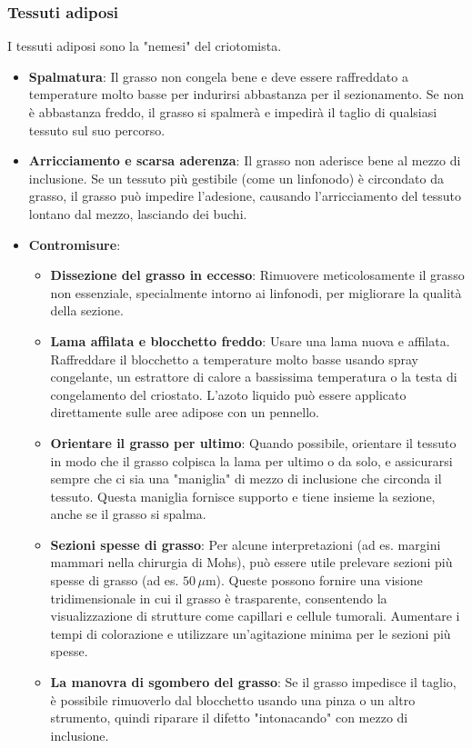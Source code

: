 \subsubsection{Tessuti adiposi}
I tessuti adiposi sono la "nemesi" del criotomista.
\begin{itemize}
    \item   \textbf{Spalmatura}: Il grasso non congela bene e deve essere raffreddato a temperature molto basse per indurirsi abbastanza per il sezionamento.  Se non è abbastanza freddo, il grasso si spalmerà e impedirà il taglio di qualsiasi tessuto sul suo percorso. 
    \item   \textbf{Arricciamento e scarsa aderenza}: Il grasso non aderisce bene al mezzo di inclusione.  Se un tessuto più gestibile (come un linfonodo) è circondato da grasso, il grasso può impedire l'adesione, causando l'arricciamento del tessuto lontano dal mezzo, lasciando dei buchi. 
    \item   \textbf{Contromisure}:
    \begin{itemize}
        \item   \textbf{Dissezione del grasso in eccesso}: Rimuovere meticolosamente il grasso non essenziale, specialmente intorno ai linfonodi, per migliorare la qualità della sezione. 
        \item   \textbf{Lama affilata e blocchetto freddo}: Usare una lama nuova e affilata.  Raffreddare il blocchetto a temperature molto basse usando spray congelante, un estrattore di calore a bassissima temperatura o la testa di congelamento del criostato.  L'azoto liquido può essere applicato direttamente sulle aree adipose con un pennello. 
        \item   \textbf{Orientare il grasso per ultimo}: Quando possibile, orientare il tessuto in modo che il grasso colpisca la lama per ultimo o da solo, e assicurarsi sempre che ci sia una "maniglia" di mezzo di inclusione che circonda il tessuto.  Questa maniglia fornisce supporto e tiene insieme la sezione, anche se il grasso si spalma. 
        \item   \textbf{Sezioni spesse di grasso}: Per alcune interpretazioni (ad es. margini mammari nella chirurgia di Mohs), può essere utile prelevare sezioni più spesse di grasso (ad es. $50\,\mu\text{m}$).  Queste possono fornire una visione tridimensionale in cui il grasso è trasparente, consentendo la visualizzazione di strutture come capillari e cellule tumorali.  Aumentare i tempi di colorazione e utilizzare un'agitazione minima per le sezioni più spesse. 
        \item   \textbf{La manovra di sgombero del grasso}: Se il grasso impedisce il taglio, è possibile rimuoverlo dal blocchetto usando una pinza o un altro strumento, quindi riparare il difetto "intonacando" con mezzo di inclusione. 
    \end{itemize}
\end{itemize}


